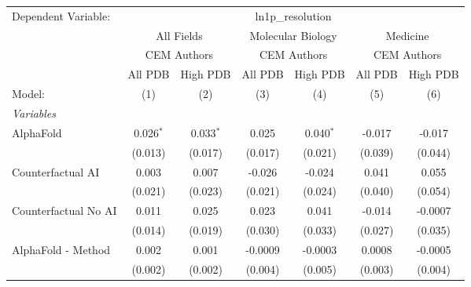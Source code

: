 \begingroup
\centering
\begin{tabular}{lcccccc}
   \tabularnewline \midrule \midrule
   Dependent Variable: & \multicolumn{6}{c}{ln1p\_resolution}\\
 & \multicolumn{2}{c}{All Fields} & \multicolumn{2}{c}{Molecular Biology} & \multicolumn{2}{c}{Medicine} \\
\cmidrule(lr){2-3} \cmidrule(lr){4-5} \cmidrule(lr){6-7}
 & \multicolumn{2}{c}{CEM Authors} & \multicolumn{2}{c}{CEM Authors} & \multicolumn{2}{c}{CEM Authors} \\
\cmidrule(lr){2-3} \cmidrule(lr){4-5} \cmidrule(lr){6-7}
 & \multicolumn{1}{c}{All PDB} & \multicolumn{1}{c}{High PDB} & \multicolumn{1}{c}{All PDB} & \multicolumn{1}{c}{High PDB} & \multicolumn{1}{c}{All PDB} & \multicolumn{1}{c}{High PDB} \\
\cmidrule(lr){2-2} \cmidrule(lr){3-3} \cmidrule(lr){4-4} \cmidrule(lr){5-5} \cmidrule(lr){6-6} \cmidrule(lr){7-7}
   Model:                                                     & (1)         & (2)          & (3)           & (4)           & (5)          & (6)\\  
   \midrule
   \emph{Variables}\\
   AlphaFold                                                  & 0.026$^{*}$ & 0.033$^{*}$  & 0.025         & 0.040$^{*}$   & -0.017       & -0.017\\   
                                                              & (0.013)     & (0.017)      & (0.017)       & (0.021)       & (0.039)      & (0.044)\\   
   Counterfactual AI                                          & 0.003       & 0.007        & -0.026        & -0.024        & 0.041        & 0.055\\   
                                                              & (0.021)     & (0.023)      & (0.021)       & (0.024)       & (0.040)      & (0.054)\\   
   Counterfactual No AI                                       & 0.011       & 0.025        & 0.023         & 0.041         & -0.014       & -0.0007\\   
                                                              & (0.014)     & (0.019)      & (0.030)       & (0.033)       & (0.027)      & (0.035)\\   
   AlphaFold - Method                                         & 0.002       & 0.001        & -0.0009       & -0.0003       & 0.0008       & -0.0005\\   
                                                              & (0.002)     & (0.002)      & (0.004)       & (0.005)       & (0.003)      & (0.004)\\   

\end{tabular}
